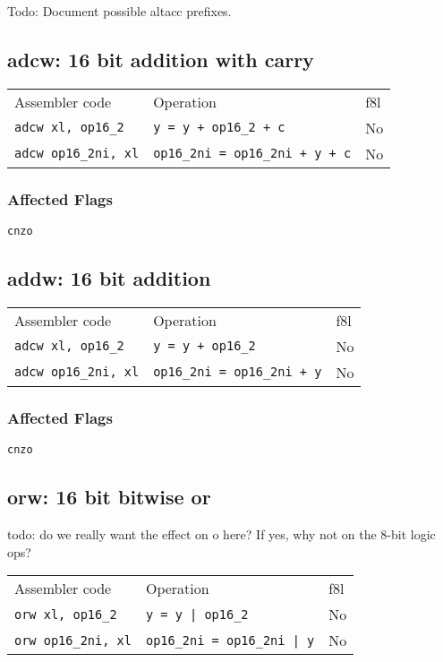 \documentclass{book}
\begin{document}
Todo: Document possible altacc prefixes.

\subsection{adcw: 16 bit addition with carry}

\begin{tabular}{l l l}
Assembler code              & Operation                              & f8l \\
\texttt{adcw xl, op16\_2}   & \texttt{y = y + op16\_2 + c}           & No \\
\texttt{adcw op16\_2ni, xl} & \texttt{op16\_2ni = op16\_2ni + y + c} & No
\end{tabular}

\subsubsection*{Affected Flags}

\texttt{cnzo}


\subsection{addw: 16 bit addition}

\begin{tabular}{l l l}
Assembler code              & Operation                          & f8l \\
\texttt{adcw xl, op16\_2}   & \texttt{y = y + op16\_2}           & No \\
\texttt{adcw op16\_2ni, xl} & \texttt{op16\_2ni = op16\_2ni + y} & No
\end{tabular}

\subsubsection*{Affected Flags}

\texttt{cnzo}


\subsection{orw: 16 bit bitwise or}

todo: do we really want the effect on o here? If yes, why not on the 8-bit logic ops?

\begin{tabular}{l l l}
Assembler code             & Operation                          & f8l \\
\texttt{orw xl, op16\_2}   & \texttt{y = y | op16\_2}           & No \\
\texttt{orw op16\_2ni, xl} & \texttt{op16\_2ni = op16\_2ni | y} & No
\end{tabular}
\end{document}
